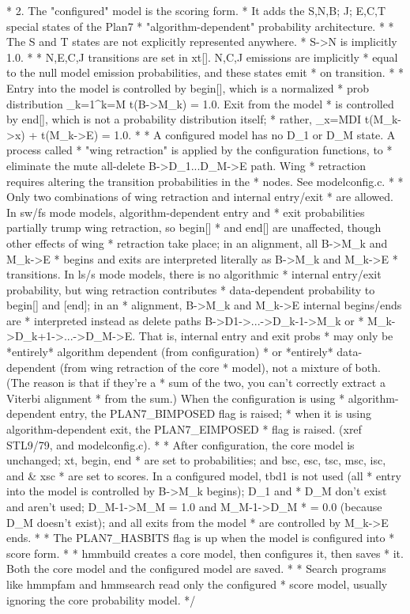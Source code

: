 \begin{cchunk}
 * 2. The "configured" model is the scoring form.
 *    It adds the S,N,B; J; E,C,T special states of the Plan7
 *    "algorithm-dependent" probability architecture.
 *    
 *    The S and T states are not explicitly represented anywhere.
 *    S->N is implicitly 1.0. 
 *    
 *    N,E,C,J transitions are set in xt[]. N,C,J emissions are implicitly
 *    equal to the null model emission probabilities, and these states emit
 *    on transition. 
 *    
 *    Entry into the model is controlled by begin[], which is a normalized
 *    prob distribution \sum_{k=1}^{k=M} t(B->M_k) = 1.0. Exit from the model
 *    is controlled by end[], which is not a probability distribution itself;
 *    rather, \sum_{x=MDI} t(M_k->x) + t(M_k->E) = 1.0. 
 *    
 *    A configured model has no D_1 or D_M state. A process called
 *    "wing retraction" is applied by the configuration functions, to
 *    eliminate the mute all-delete B->D_1...D_M->E path. Wing
 *    retraction requires altering the transition probabilities in the
 *    nodes. See modelconfig.c.
 *    
 *    Only two combinations of wing retraction and internal entry/exit
 *    are allowed. In sw/fs mode models, algorithm-dependent entry and
 *    exit probabilities partially trump wing retraction, so begin[]
 *    and end[] are unaffected, though other effects of wing
 *    retraction take place; in an alignment, all B->M_k and M_k->E
 *    begins and exits are interpreted literally as B->M_k and M_k->E
 *    transitions. In ls/s mode models, there is no algorithmic
 *    internal entry/exit probability, but wing retraction contributes
 *    data-dependent probability to begin[] and [end]; in an
 *    alignment, B->M_k and M_k->E internal begins/ends are
 *    interpreted instead as delete paths B->D1->...->D_k-1->M_k or
 *    M_k->D_k+1->...->D_M->E.  That is, internal entry and exit probs
 *    may only be *entirely* algorithm dependent (from configuration)
 *    or *entirely* data-dependent (from wing retraction of the core
 *    model), not a mixture of both. (The reason is that if they're a
 *    sum of the two, you can't correctly extract a Viterbi alignment
 *    from the sum.) When the configuration is using
 *    algorithm-dependent entry, the PLAN7_BIMPOSED flag is raised;
 *    when it is using algorithm-dependent exit, the PLAN7_EIMPOSED
 *    flag is raised.  (xref STL9/79, and modelconfig.c).
 *    
 *    After configuration, the core model is unchanged; xt, begin, end
 *    are set to probabilities; and bsc, esc, tsc, msc, isc, and & xsc
 *    are set to scores. In a configured model, tbd1 is not used (all
 *    entry into the model is controlled by B->M_k begins); D_1 and
 *    D_M don't exist and aren't used; D_M-1->M_M = 1.0 and M_M-1->D_M
 *    = 0.0 (because D_M doesn't exist); and all exits from the model
 *    are controlled by M_k->E ends.
 *    
 *    The PLAN7_HASBITS flag is up when the model is configured into
 *    score form.
 *    
 * hmmbuild creates a core model, then configures it, then saves
 * it. Both the core model and the configured model are saved.
 * 
 * Search programs like hmmpfam and hmmsearch read only the configured
 * score model, usually ignoring the core probability model.
 */


\end{cchunk}
